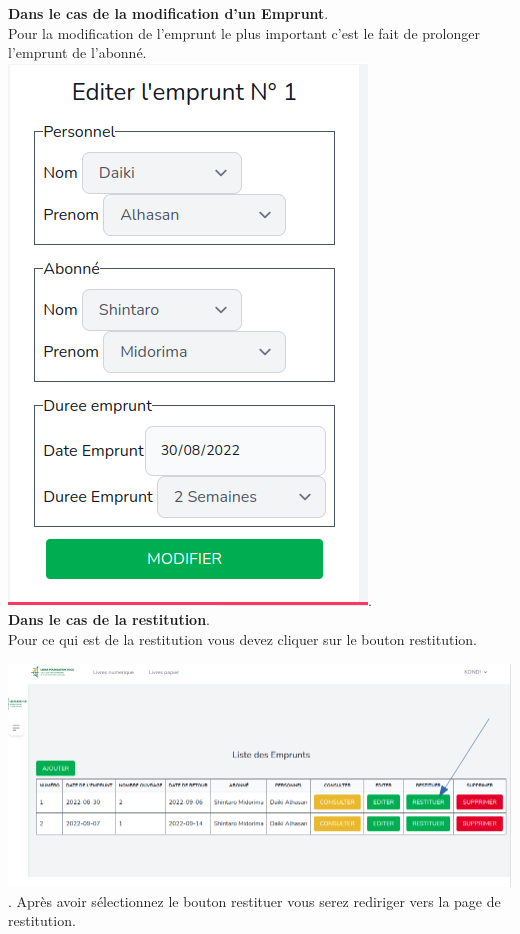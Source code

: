 \documentclass[12pt,a4paper]{article}
\begin{document}
\newpage
\textbf{Dans le cas de la modification d'un Emprunt}.\\
Pour la modification de l'emprunt le plus important c'est le fait de prolonger l'emprunt de l'abonné.\\

\includegraphics[scale=0.5]{images/EmpruntEdit.png}.\\

\textbf{Dans le cas de la restitution}.\\
Pour ce qui est de la restitution vous devez cliquer sur le bouton restitution.

\includegraphics[scale=0.5]{images/RestitutionSectionner.png}.
\newpage
Après avoir sélectionnez le bouton restituer vous serez rediriger vers la page de restitution.\\
\end{document}
